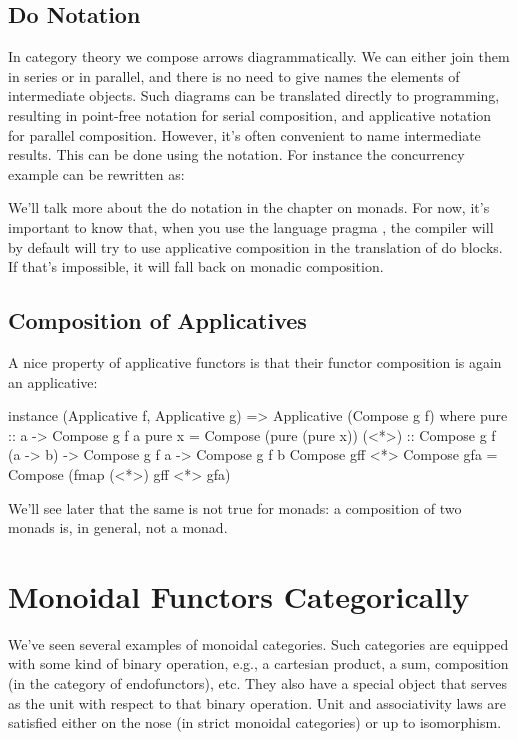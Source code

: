 \documentclass[DaoFP]{subfiles}
\begin{document}
\subsection{Do Notation}
In category theory we compose arrows diagrammatically. We can either join them in series or in parallel, and there is no need to give names the elements of intermediate objects. Such diagrams can be translated directly to programming, resulting in point-free notation for serial composition, and applicative notation for parallel composition. However, it's often convenient to name intermediate results. This can be done using the  notation. For instance the concurrency example can be rewritten as:

We'll talk more about the do notation in the chapter on monads. For now, it's important to know that, when you use the language pragma , the compiler will by default will try to use applicative composition in the translation of do blocks. If that's impossible, it will fall back on monadic composition.

\subsection{Composition of Applicatives}

A nice property of applicative functors is that their functor composition is again an applicative:
\begin{haskell}
instance (Applicative f, Applicative g) => 
  Applicative (Compose g f) where
    pure :: a -> Compose g f a
    pure x = Compose (pure (pure x))
    (<*>) :: Compose g f (a -> b) -> Compose g f a -> Compose g f b
    Compose gff <*> Compose gfa = Compose (fmap (<*>) gff <*> gfa)
\end{haskell}
We'll see later that the same is not true for monads: a composition of two monads is, in general, not a monad.

\section{Monoidal Functors Categorically}

We've seen several examples of monoidal categories. Such categories are equipped with some kind of binary operation, e.g., a cartesian product, a sum, composition (in the category of endofunctors), etc. They also have a special object that serves as the unit with respect to that binary operation. Unit and associativity laws are satisfied either on the nose (in strict monoidal categories) or up to isomorphism.
\end{document}
